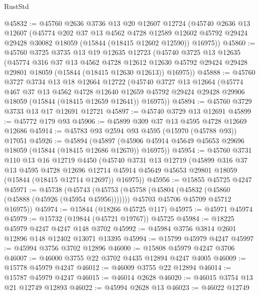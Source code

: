 \begin{lexlean}{RustStd}
\begin{coremodule}
@45832 := @45760
    @2636
    @3736
    @13
    @20
    @12607
    @12724
    (@45740
      @2636
      @13
      @12607
      (@45774
        @202
        @37
        @13
        @4562
        @4728
        @12589
        @12602
        @45792
        @29424
        @29428
        @30082
        @18059
        (@15844 (@18415 @12602 @12590))
        @16975))
@45860 := @45760
    @3725
    @3735
    @13
    @19
    @12635
    @12723
    (@45740
      @3725
      @13
      @12635
      (@45774
        @316
        @37
        @13
        @4562
        @4728
        @12612
        @12630
        @45792
        @29424
        @29428
        @29801
        @18059
        (@15844 (@18415 @12630 @12613))
        @16975))
@45888 := @45760
    @3727
    @3734
    @13
    @18
    @12664
    @12722
    (@45740
      @3727
      @13
      @12664
      (@45774
        @467
        @37
        @13
        @4562
        @4728
        @12640
        @12659
        @45792
        @29424
        @29428
        @29906
        @18059
        (@15844 (@18415 @12659 @12641))
        @16975))
@45894 := @45760 @3729 @3733 @13 @17 @12691 @12721
@45897 := @45740 @3729 @13 @12691
@45899 := @45772 @179 @93
@45906 := @45899 @309 @37 @13 @4595 @4728 @12669 @12686
@45914 := @45783 @93 @2594 @93 @4595 (@15970 (@45788 @93)) @17051
@45926 := @45894
    (@45897 (@45906 @45914 @45649 @45653 @29696 @18059 (@15844 (@18415 @12686 @12670)) @16975))
@45954 := @45760
    @3731
    @110
    @13
    @16
    @12719
    @4450
    (@45740
      @3731
      @13
      @12719
      (@45899
        @316
        @37
        @13
        @4595
        @4728
        @12696
        @12714
        @45914
        @45649
        @45653
        @29801
        @18059
        (@15844 (@18415 @12714 @12697))
        @16975))
@45956 := @15855 @45725 @4247
@45971 := @45738
    (@45743
      (@45753
        (@45758 (@45804 (@45832 (@45860 (@45888 (@45926 (@45954 @45956)))))))
        @45703
        @45706
        @45709
        @45712
        @16975))
@45974 := @15844 (@18266 @45725 @117)
@45975 := @45971 @45974
@45979 := @15732 (@19844 (@45721 @19767)) @45725
@45984 := @18225 @45979 @4247 @4247 @148 @3702
@45992 := @45984 @3756 @3814 @2601 @12896 @148 @12402 @13071 @13395
@45994 := @15799 @45979 @4247
@45997 := @45994 @3756 @3702 @12896
@46000 := @15808 @45979 @4247 @3706
@46007 := @46000 @3755 @22 @3702 @4435 @12894 @4247 @4005
@46009 := @15778 @45979 @4247
@46012 := @46009 @3755 @22 @12894
@46014 := @15787 @45979 @4247
@46015 := @46014 @2628
@46020 := @46015 @3754 @13 @21 @12749 @12893
@46022 := @45994 @2628 @13
@46023 := @46022 @12749

\end{coremodule}
\end{lexlean}
